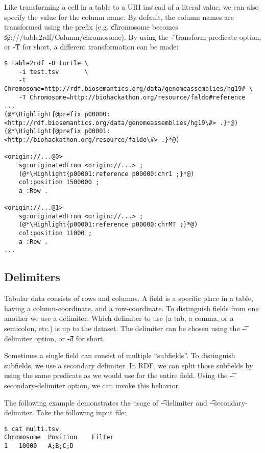   Like transforming a cell in a table to a URI instead of a literal value,
  we can also specify the value for the column name.  By default, the column
  names are transformed using the  prefix (e.g.
  \t{chromosome} becomes
  \t{sg://\sgversion{}/table2rdf/Column/chromosome}).  By using
  the \t{-{}-transform-predicate} option, or \t{-T} for short, a
  different transformation can be made:

\begin{lstlisting}
$ table2rdf -O turtle \
    -i test.tsv       \
    -t Chromosome=http://rdf.biosemantics.org/data/genomeassemblies/hg19# \
    -T Chromosome=http://biohackathon.org/resource/faldo#reference
...
(@*\Highlight{@prefix p00000: <http://rdf.biosemantics.org/data/genomeassemblies/hg19\#> .}*@)
(@*\Highlight{@prefix p00001: <http://biohackathon.org/resource/faldo\#> .}*@)

<origin://...@0>
    sg:originatedFrom <origin://...> ;
    (@*\Highlight{p00001:reference p00000:chr1 ;}*@)
    col:position 1500000 ;
    a :Row .

<origin://...@1>
    sg:originatedFrom <origin://...> ;
    (@*\Highlight{p00001:reference p00000:chrMT ;}*@)
    col:position 11000 ;
    a :Row .
...
\end{lstlisting}

\subsection{Delimiters}

  Tabular data consists of rows and columns.  A field is a specific place in
  a table, having a column-coordinate, and a row-coordinate.  To distinguish
  fields from one another we use a delimiter.  Which delimiter to use (a tab,
  a comma, or a semicolon, etc.) is up to the dataset.  The delimiter
  can be chosen using the \t{-{}-delimiter} option, or \t{-d} for
  short.

  Sometimes a single field can consist of multiple ``subfields''.  To
  distinguish subfields, we use a secondary delimiter.  In RDF, we can split
  those subfields by using the same predicate as we would use for the entire
  field.  Using the \t{-{}-secondary-delimiter} option, we can invoke
  this behavior.

  The following example demonstrates the usage of \t{-{}-delimiter} and
  \t{-{}-secondary-delimiter}.  Take the following input file:

\begin{lstlisting}
$ cat multi.tsv
Chromosome	Position	Filter
1	10000	A;B;C;D
\end{lstlisting}

